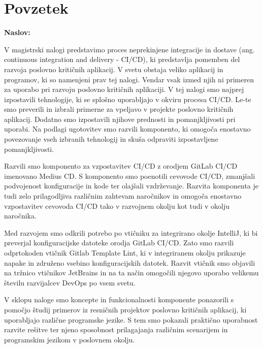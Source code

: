 \chapter*{Povzetek}

\noindent\textbf{Naslov:} \ttitle
\bigskip

V magistrski nalogi predstavimo proces neprekinjene integracije in dostave (ang. continuous integration and delivery - CI/CD), ki predstavlja pomemben del razvoja poslovno kritičnih aplikacij. V svetu obstaja veliko aplikacij in programov, ki so namenjeni prav tej nalogi. Vendar vsak izmed njih ni primeren za uporabo pri razvoju poslovno kritičnih aplikaciji. V tej nalogi smo najprej izpostavili tehnologije, ki se splošno uporabljajo v okviru procesa CI/CD. Le-te smo preverili in izbrali primerne za vpeljavo v projekte poslovno kritičnih aplikacij. Dodatno smo izpostavili njihove prednosti in pomanjkljivosti pri uporabi. Na podlagi ugotovitev smo razvili komponento, ki omogoča enostavno povezovanje vseh izbranih tehnologij in skuša odpraviti izpostavljene pomanjkljivosti.

Razvili smo komponento za vzpostavitev CI/CD z orodjem GitLab CI/CD imenovano Medius CD. S komponento smo poenotili cevovode CI/CD, zmanjšali podvojenost konfiguracije in kode ter olajšali vzdrževanje. Razvita komponenta je tudi zelo prilagodljiva različnim zahtevam naročnikov in omogoča enostavno vzpostavitev cevovoda CI/CD tako v razvojnem okolju kot tudi v okolju naročnika.

Med razvojem smo odkrili potrebo po vtičniku za integrirano okolje IntelliJ, ki bi preverjal konfiguracijske datoteke orodja GitLab CI/CD. Zato smo razvili odprtokoden vtičnik Gitlab Template Lint, ki v integriranem okolju prikazuje napake in združeno vsebino konfiguracijskih datotek. Razvit vtičnik smo objavili na tržnico vtičnikov JetBrains in na ta način omogočili njegovo uporabo velikemu številu razvijalcev DevOps po vsem svetu.

V sklopu naloge smo koncepte in funkcionalnosti komponente ponazorili s pomočjo študij primerov iz resničnih projektov poslovno kritičnih aplikacij, ki uporabljajo različne programske jezike. S tem smo pokazali praktično uporabnost razvite rešitve ter njeno sposobnost prilagajanja različnim scenarijem in programskim jezikom v poslovnem okolju.


